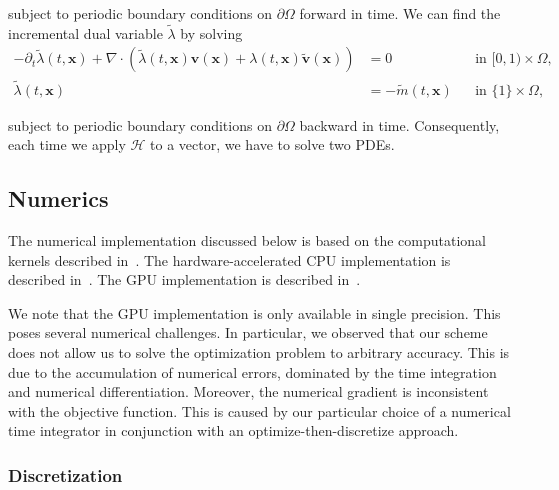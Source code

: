 \documentclass[11pt]{amsart}
\newcommand\op[1]{\ensuremath{\mathcal{#1}}}
\newcommand{\idiv}{\ensuremath{\nabla\cdot}}
\renewcommand{\vec}[1]{\ensuremath{\boldsymbol{#1}}}
\begin{document}
\noindent subject to periodic boundary conditions on $\partial\Omega$ forward in time. We can find the incremental dual variable $\tilde{\lambda}$ by solving
\begin{subequations}\label{e:incadj}
\begin{align}
-\partial_t \tilde{\lambda}(t,\vec{x})
+ \idiv(\tilde{\lambda}(t,\vec{x}) \vec{v}(\vec{x}) + \lambda(t,\vec{x}) \vec{\tilde{v}}(\vec{x})) & = 0
&& \text{in}\,\,[0,1) \times \Omega,
\\
\tilde{\lambda}(t,\vec{x}) &= -\tilde{m}(t,\vec{x})
&& \text{in}\,\,\{1\} \times \Omega,
\end{align}
\end{subequations}

\noindent subject to periodic boundary conditions on $\partial\Omega$ backward in time. Consequently, each time we apply $\op{H}$ to a vector, we have to solve two PDEs.




\subsection{Numerics}\label{s:numerics}

The numerical implementation discussed below is based on the computational kernels described in~\cite{Mang:2015a,Mang:2019a,Mang:2017b,Mang:2016b,Gholami:2017a,Brunn:2020a,Brunn:2021a,Mang:2019a}. The hardware-accelerated CPU implementation is described in~\cite{Mang:2016b,Mang:2019a,Gholami:2017a}. The GPU implementation is described in~\cite{Brunn:2020a,Brunn:2021a}.

We note that the GPU implementation is only available in single precision. This poses several numerical challenges. In particular, we observed that our scheme does not allow us to solve the optimization problem to arbitrary accuracy. This is due to the accumulation of numerical errors, dominated by the time integration and numerical differentiation. Moreover, the numerical gradient is inconsistent with the objective function. This is caused by our particular choice of a numerical time integrator in conjunction with an optimize-then-discretize approach.




\subsubsection{Discretization}
\end{document}
